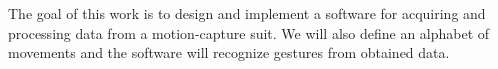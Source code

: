 The goal of this work is to design and implement a software for acquiring and processing data from a motion-capture suit. We will also define an alphabet of movements and the software will recognize gestures from obtained data.